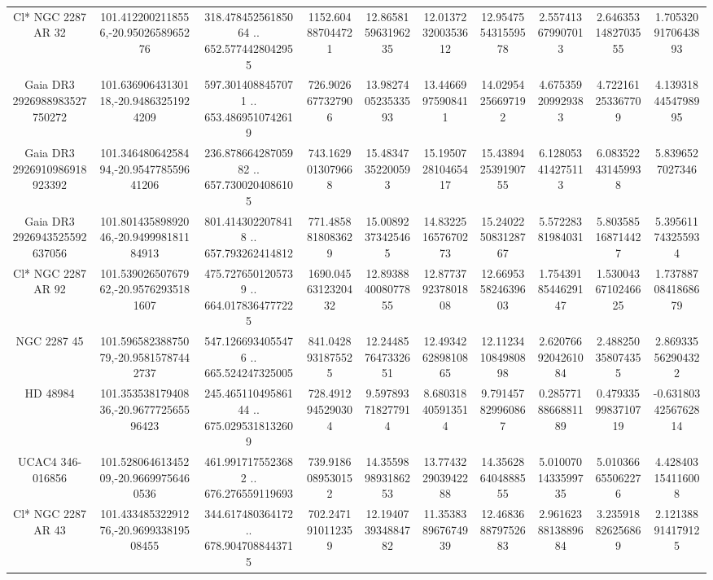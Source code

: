 \begin{table}
\begin{tabular}{cccccccccc}
Cl* NGC 2287     AR      32 & 101.4122002118556,-20.9502658965276 & 318.47845256185064 .. 652.5774428042955 & 1152.604887044721 & 12.865815963196235 & 12.013723200353612 & 12.954755431559578 & 2.557413679907013 & 2.6463531482703555 & 1.7053209170643893 \\
Gaia DR3 2926988983527750272 & 101.63690643130118,-20.94863251924209 & 597.3014088457071 .. 653.4869510742619 & 726.9026677327906 & 13.982740523533593 & 13.44669975908411 & 14.02954256697192 & 4.675359209929383 & 4.722161253367709 & 4.1393184454798995 \\
Gaia DR3 2926910986918923392 & 101.34648064258494,-20.954778559641206 & 236.87866428705982 .. 657.7300204086105 & 743.1629013079668 & 15.48347352200593 & 15.195072810465417 & 15.438942539190755 & 6.128053414275113 & 6.083522431459938 & 5.8396527027346 \\
Gaia DR3 2926943525592637056 & 101.80143589892046,-20.949998181184913 & 801.4143022078418 .. 657.793262414812 & 771.4858818083629 & 15.00892373425465 & 14.832251657670273 & 15.240225083128767 & 5.57228381984031 & 5.803585168714427 & 5.395611743255934 \\
Cl* NGC 2287     AR      92 & 101.53902650767962,-20.95762935181607 & 475.7276501205739 .. 664.0178364777225 & 1690.0456312320432 & 12.893884008077855 & 12.877379237801808 & 12.669535824639603 & 1.7543918544629147 & 1.5300436710246625 & 1.7378870841868679 \\
NGC  2287    45 & 101.59658238875079,-20.95815787442737 & 547.1266934055476 .. 665.524247325005 & 841.0428931875525 & 12.244857647332651 & 12.493426289810865 & 12.112341084980898 & 2.6207669204261084 & 2.488250358074355 & 2.869335562904322 \\
HD  48984 & 101.35353817940836,-20.967772565596423 & 245.46511049586144 .. 675.0295318132609 & 728.4912945290304 & 9.597893718277914 & 8.680318405913514 & 9.791457829960867 & 0.2857718866881189 & 0.4793359983710719 & -0.6318034256762814 \\
UCAC4 346-016856 & 101.52806461345209,-20.96699756460536 & 461.9917175523682 .. 676.276559119693 & 739.9186089530152 & 14.355989893186253 & 13.774322903942288 & 14.356286404888555 & 5.0100701433599735 & 5.010366655062276 & 4.428403154116008 \\
Cl* NGC 2287     AR      43 & 101.43348532291276,-20.969933819508455 & 344.617480364172 .. 678.9047088443715 & 702.2471910112359 & 12.194073934884782 & 11.353838967674939 & 12.468368879752683 & 2.9616238813889684 & 3.235918826256869 & 2.121388914179125 \\

\end{tabular}
\end{table}
